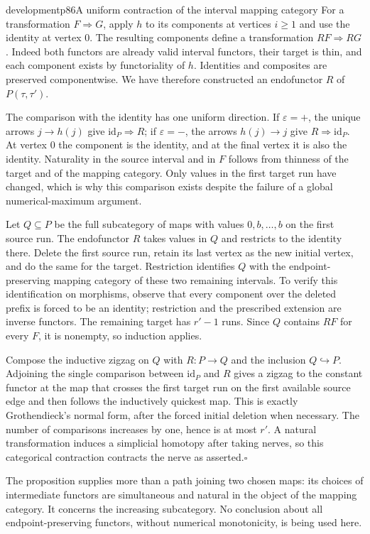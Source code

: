 \begin{dcomment}{development}{p86}{A uniform contraction of the interval mapping category}
For a transformation $F\Rightarrow G$, apply $h$ to its components at vertices $i\geq1$ and use the identity at vertex $0$. The resulting components define a transformation $RF\Rightarrow RG$. Indeed both functors are already valid interval functors, their target is thin, and each component exists by functoriality of $h$. Identities and composites are preserved componentwise. We have therefore constructed an endofunctor $R$ of $P(\tau,\tau')$.

The comparison with the identity has one uniform direction. If $\varepsilon=+$, the unique arrows $j\to h(j)$ give $\mathrm{id}_P\Rightarrow R$; if $\varepsilon=-$, the arrows $h(j)\to j$ give $R\Rightarrow\mathrm{id}_P$. At vertex $0$ the component is the identity, and at the final vertex it is also the identity. Naturality in the source interval and in $F$ follows from thinness of the target and of the mapping category. Only values in the first target run have changed, which is why this comparison exists despite the failure of a global numerical-maximum argument.

Let $Q\subseteq P$ be the full subcategory of maps with values $0,b,\ldots,b$ on the first source run. The endofunctor $R$ takes values in $Q$ and restricts to the identity there. Delete the first source run, retain its last vertex as the new initial vertex, and do the same for the target. Restriction identifies $Q$ with the endpoint-preserving mapping category of these two remaining intervals. To verify this identification on morphisms, observe that every component over the deleted prefix is forced to be an identity; restriction and the prescribed extension are inverse functors. The remaining target has $r'-1$ runs. Since $Q$ contains $RF$ for every $F$, it is nonempty, so induction applies.

Compose the inductive zigzag on $Q$ with $R:P\to Q$ and the inclusion $Q\hookrightarrow P$. Adjoining the single comparison between $\mathrm{id}_P$ and $R$ gives a zigzag to the constant functor at the map that crosses the first target run on the first available source edge and then follows the inductively quickest map. This is exactly Grothendieck's normal form, after the forced initial deletion when necessary. The number of comparisons increases by one, hence is at most $r'$. A natural transformation induces a simplicial homotopy after taking nerves, so this categorical contraction contracts the nerve as asserted.\hfill$\square$

The proposition supplies more than a path joining two chosen maps: its choices of intermediate functors are simultaneous and natural in the object of the mapping category. It concerns the increasing subcategory. No conclusion about all endpoint-preserving functors, without numerical monotonicity, is being used here.
\end{dcomment}

